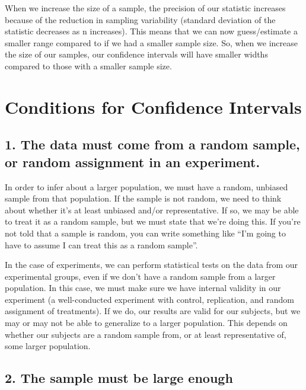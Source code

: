 \documentclass[
]{book}
\begin{document}
When we increase the size of a sample, the precision of our statistic increases because of the reduction in sampling variability (standard deviation of the statistic decreases as n increases). This means that we can now guess/estimate a smaller range compared to if we had a smaller sample size. So, when we increase the size of our samples, our confidence intervals will have smaller widths compared to those with a smaller sample size.

\hypertarget{conditions-for-confidence-intervals}{%
\section{Conditions for Confidence Intervals}\label{conditions-for-confidence-intervals}}

\hypertarget{the-data-must-come-from-a-random-sample-or-random-assignment-in-an-experiment.}{%
\subsection*{1. The data must come from a random sample, or random assignment in an experiment.}\label{the-data-must-come-from-a-random-sample-or-random-assignment-in-an-experiment.}}

In order to infer about a larger population, we must have a random, unbiased sample from that population. If the sample is not random, we need to think about whether it's at least unbiased and/or representative. If so, we may be able to treat it as a random sample, but we must state that we're doing this. If you're not told that a sample is random, you can write something like ``I'm going to have to assume I can treat this as a random sample''.

In the case of experiments, we can perform statistical tests on the data from our experimental groups, even if we don't have a random sample from a larger population. In this case, we must make sure we have internal validity in our experiment (a well-conducted experiment with control, replication, and random assignment of treatments). If we do, our results are valid for our subjects, but we may or may not be able to generalize to a larger population. This depends on whether our subjects are a random sample from, or at least representative of, some larger population.

\hypertarget{the-sample-must-be-large-enough}{%
\subsection*{2. The sample must be large enough}\label{the-sample-must-be-large-enough}}
\end{document}
